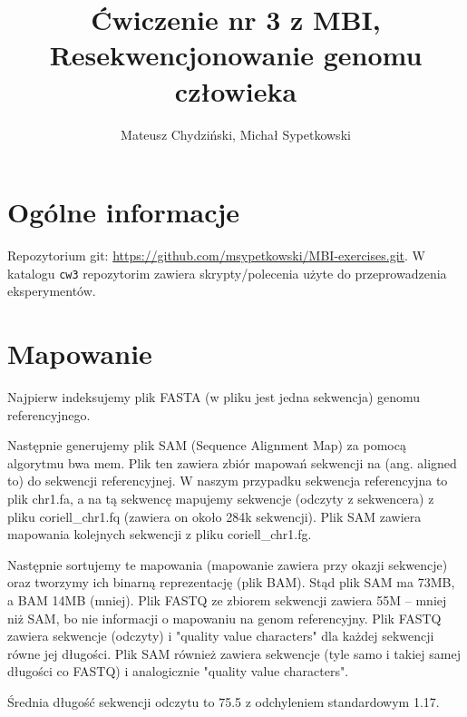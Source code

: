 \documentclass[a4paper]{article}
\begin{document}
\title{Ćwiczenie nr 3 z MBI, Resekwencjonowanie genomu człowieka}
\author{Mateusz Chydziński, Michał Sypetkowski}
\maketitle

\section{Ogólne informacje}
Repozytorium git: \url{https://github.com/msypetkowski/MBI-exercises.git}.
W katalogu \texttt{cw3} repozytorim zawiera skrypty/polecenia użyte do przeprowadzenia eksperymentów.

\section{Mapowanie}

Najpierw indeksujemy plik FASTA (w pliku jest jedna sekwencja) genomu referencyjnego.

Następnie generujemy plik SAM (Sequence Alignment Map) za pomocą algorytmu bwa mem.
Plik ten zawiera zbiór mapowań sekwencji na (ang. aligned to) do sekwencji referencyjnej.
W naszym przypadku sekwencja referencyjna to plik chr1.fa,
a na tą sekwencę mapujemy sekwencje (odczyty z sekwencera)
z pliku coriell\_chr1.fq (zawiera on około 284k sekwencji).
Plik SAM zawiera mapowania kolejnych sekwencji z pliku coriell\_chr1.fg.

Następnie sortujemy te mapowania (mapowanie zawiera przy okazji sekwencje)
oraz tworzymy ich binarną reprezentację (plik BAM).
Stąd plik SAM ma 73MB, a BAM 14MB (mniej).
Plik FASTQ ze zbiorem sekwencji zawiera 55M --
mniej niż SAM, bo nie informacji o mapowaniu na genom referencyjny.
Plik FASTQ zawiera sekwencje (odczyty) i "quality value characters" dla każdej sekwencji równe jej długości.
Plik SAM również zawiera sekwencje (tyle samo i takiej samej długości co FASTQ) i analogicznie "quality value characters".

Średnia długość sekwencji odczytu to 75.5 z odchyleniem standardowym 1.17.
\end{document}
